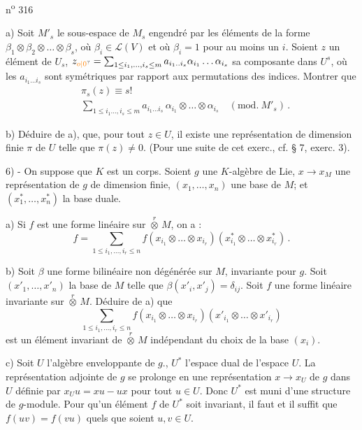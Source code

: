 
\hfill n\textsuperscript{o} 316

a) Soit $M'_s$ le sous-espace de $M_s$ engendré par les éléments de la forme $\beta_1\otimes\beta_2\otimes\ldots\otimes\beta_s$, où $\beta_i\in\mathcal{L}(V)$ et où $\beta_i=1$ pour au moins un $i$. Soient $z$ un élément de $U_s$, $z_{\unsure{o|0}}=\sum_{1\leq i_1,\ldots,i_s\leq m}a_{i_1..i_s}\alpha_{i_1}\ldots\alpha_{i_s}$ sa composante dans $U^s$, où les $a_{i_1\ldots i_s}$ sont symétriques par rapport aux permutations des indices. Montrer que
\[
\begin{aligned}
&\pi_s(z)\equiv s!\\
&\sum_{1\leq i_1\ldots,i_s\leq m}a_{i_1\ldots i_s}\,\alpha_{i_1}\otimes\ldots\otimes\alpha_{i_s}\quad(\mathrm{mod.}\ M'_s)\,.
\end{aligned}
\]

b) Déduire de a), que, pour tout $z\in U$, il existe une représentation de dimension finie $\pi$ de $U$ telle que $\pi(z)\ne 0$. (Pour une suite de cet exerc., cf. § 7, exerc. 3).

6) - On suppose que $K$ est un corps. Soient $g$ une $K$-algèbre de Lie, $x\longrightarrow x_M$ une représentation de $g$ de dimension finie, $(x_1,\ldots,x_n)$ une base de $M$; et $(x^*_1,\ldots,x^*_n)$ la base duale.

a) Si $f$ est une forme linéaire sur $\overset{r}{\otimes}\,M$, on a :
\[
f=\sum_{1\leq i_1,\ldots,i_r\leq n}f(x_{i_1}\otimes\ldots\otimes x_{i_r})(x^*_{i_1}\otimes\ldots\otimes x^*_{i_r})\,.
\]

b) Soit $\beta$ une forme bilinéaire non dégénérée sur $M$, invariante pour $g$. Soit $(x'_1,\ldots,x'_n)$ la base de $M$ telle que $\beta(x'_i,x'_j)=\delta_{ij}$. Soit $f$ une forme linéaire invariante sur $\overset{r}{\otimes}\,M$. Déduire de a) que
\[
\sum_{1\leq i_1,\ldots,i_r\leq n}f(x_{i_1}\otimes\ldots\otimes x_{i_r})(x'_{i_1}\otimes\ldots\otimes x'_{i_r})
\]
est un élément invariant de $\overset{r}{\otimes}\,M$ indépendant du choix de la base $(x_i)$.

c) Soit $U$ l'algèbre enveloppante de $g$., $U^*$ l'espace dual de l'espace $U$. La représentation adjointe de $g$ se prolonge en une représentation $x\longrightarrow x_U$ de $g$ dans $U$ définie par $x_Uu=xu-ux$ pour tout $u\in U$. Donc $U^*$ est muni d'une structure de $g$-module. Pour qu'un élément $f$ de $U^*$ soit invariant, il faut et il suffit que $f(uv)=f(vu)$ quels que soient $u,v\in U$.

